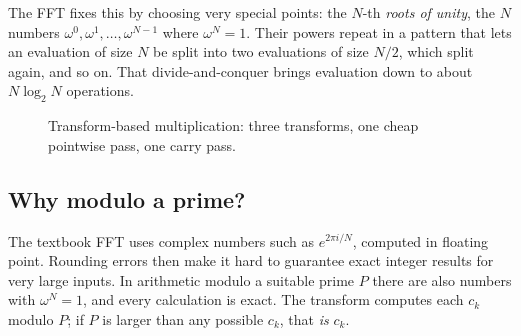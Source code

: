 The FFT fixes this by choosing very special points: the $N$-th \emph{roots of unity}, the
$N$ numbers $\omega^0, \omega^1, \dots, \omega^{N-1}$ where $\omega^N = 1$. Their powers
repeat in a pattern that lets an evaluation of size $N$ be split into two evaluations of
size $N/2$, which split again, and so on. That divide-and-conquer brings evaluation down
to about $N \log_2 N$ operations.

\begin{figure}[ht]
\centering
{}
\caption{Transform-based multiplication: three transforms, one cheap pointwise pass, one
carry pass.}
\end{figure}

\subsection{Why modulo a prime?}

The textbook FFT uses complex numbers such as $e^{2\pi i/N}$, computed in floating point.
Rounding errors then make it hard to guarantee exact integer results for very large
inputs. In arithmetic modulo a suitable prime $P$ there are also numbers with
$\omega^N = 1$, and every calculation is exact. The transform computes each $c_k$ modulo
$P$; if $P$ is larger than any possible $c_k$, that \emph{is} $c_k$.

